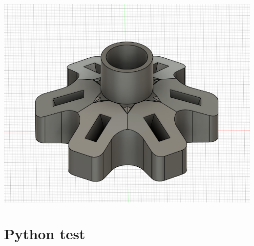 \documentclass[a4paper, letterpaper]{report}
\begin{document}
    
    \begin{center}
        \includegraphics[scale=0.3]{image - Copie.png}
    \end{center}


\section{Python test}
\label{ss:python}
\end{document}
